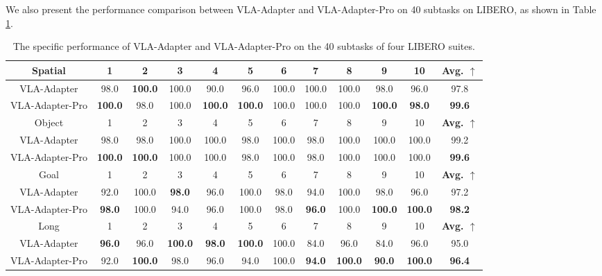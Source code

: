 We also present the performance comparison between VLA-Adapter and VLA-Adapter-Pro on 40 subtasks on LIBERO, as shown in Table \ref{TableI1}.

\begin{table}[!htbp]
	\centering
    \setlength{\tabcolsep}{1mm}
	\caption{The specific performance of VLA-Adapter and VLA-Adapter-Pro on the 40 subtasks of four LIBERO \citep{LIBERO-2023} suites.}\label{TableI1}%
	\begin{tabular}{c|cccccccccc|c}
		\toprule[1pt]
		Spatial & 1     & 2     & 3     & 4     & 5     & 6     & 7     & 8     & 9     & 10    & \textbf{Avg. $\uparrow$} \\
		\midrule[0.5pt]
		VLA-Adapter &  98.0     &   \textbf{100.0}    &   100.0    & 90.0      &   96.0    &  100.0     &   100.0    &    100.0   &    98.0   &    96.0   & 97.8 \\
        VLA-Adapter-Pro &  \textbf{100.0}     &   98.0    &   100.0    & \textbf{100.0}      &   \textbf{100.0}    &  100.0     &   100.0    &    100.0   &    \textbf{100.0}   &    \textbf{98.0}   & \textbf{99.6} \\
        \midrule[1pt]
        
		Object & 1     & 2     & 3     & 4     & 5     & 6     & 7     & 8     & 9     & 10    & \textbf{Avg. $\uparrow$} \\
		\midrule[0.5pt]
        VLA-Adapter & 98.0  & 98.0  & 100.0  & 100.0  & 98.0  & 100.0 & 98.0  & 100.0 & 100.0  & 100.0 & 99.2 \\
        VLA-Adapter-Pro & \textbf{100.0}  & \textbf{100.0}  & 100.0  & 100.0  & 98.0  & 100.0 & 98.0  & 100.0 & 100.0  & 100.0 & \textbf{99.6} \\
        \midrule[1pt]
        
		Goal & 1     & 2     & 3     & 4     & 5     & 6     & 7     & 8     & 9     & 10    & \textbf{Avg. $\uparrow$} \\
        \midrule[0.5pt]
        VLA-Adapter&   92.0    &    100.0   &   \textbf{98.0}    &    96.0   &     100.0  &    98.0   &   94.0    &   100.0    &  98.0     &   96.0    & 97.2 \\
        VLA-Adapter-Pro & \textbf{98.0}  &100.0  & 94.0  & 96.0  & 100.0  & 98.0 & \textbf{96.0}  & 100.0 &\textbf{100.0}  & \textbf{100.0} & \textbf{98.2} \\
        \midrule[1pt]
        
		Long  & 1     & 2     & 3     & 4     & 5     & 6     & 7     & 8     & 9     & 10    & \textbf{Avg. $\uparrow$} \\
        \midrule[0.5pt]
        VLA-Adapter&\textbf{96.0}&96.0& \textbf{100.0} &\textbf{98.0}&\textbf{100.0}&100.0& 84.0& 96.0& 84.0& 96.0&95.0 \\
        VLA-Adapter-Pro&92.0&\textbf{100.0}& 98.0 &96.0&94.0&100.0& \textbf{94.0}& \textbf{100.0}& \textbf{90.0}& \textbf{100.0}&\textbf{96.4} \\
		\bottomrule[1pt]
	\end{tabular}%
\end{table}%